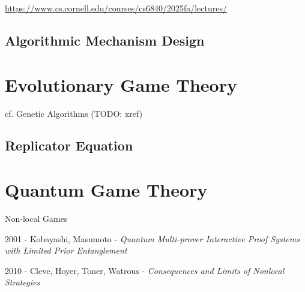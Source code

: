 \url{https://www.cs.cornell.edu/courses/cs6840/2025fa/lectures/}



\subsection{Algorithmic Mechanism Design}
\label{sec:algorithmic_mechanism_design}



\section{Evolutionary Game Theory}\label{sec:evolutionary_game_theory}

cf. Genetic Algorithms (TODO: xref)



\subsection{Replicator Equation}\label{sec:replicator_equation}



\section{Quantum Game Theory}\label{sec:quantum_game_theory}

Non-local Games

2001 - Kobayashi, Masumoto - \emph{Quantum Multi-prover Interactive Proof
  Systems with Limited Prior Entanglement}

2010 - Cleve, Hoyer, Toner, Watrous -
\emph{Consequences and Limits of Nonlocal Strategies}
